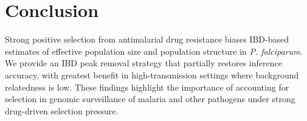 \documentclass[11pt]{article}
\begin{document}
\section{Conclusion}

Strong positive selection from antimalarial drug resistance biases IBD-based estimates of effective population size and population structure in \textit{P. falciparum}. We provide an IBD peak removal strategy that partially restores inference accuracy, with greatest benefit in high-transmission settings where background relatedness is low. These findings highlight the importance of accounting for selection in genomic surveillance of malaria and other pathogens under strong drug-driven selection pressure.



\end{document}
